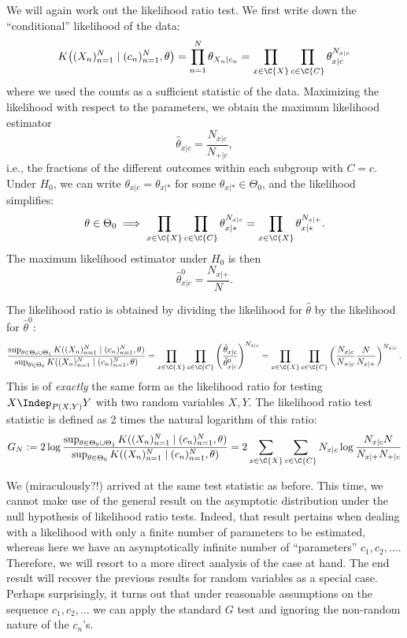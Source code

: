 We will again work out the likelihood ratio test.
We first write down the ``conditional'' likelihood of the data:
$$K\big((X_n)_{n=1}^N \mid (c_n)_{n=1}^N, \theta\big)
= \prod_{n=1}^N \theta_{X_n|c_n} 
= \prod_{x\in\C{X}} \prod_{c\in\C{C}} \theta_{x|c}^{N_{x|c}}$$
where we used the counts as a sufficient statistic of the data.
Maximizing the likelihood with respect to the parameters, we obtain the maximum likelihood estimator
$$\hat \theta_{x|c} = \frac{N_{x|c}}{N_{+|c}},$$
i.e., the fractions of the different outcomes within each subgroup with $C = c$.
Under $H_0$, we can write $\theta_{x|c} = \theta_{x|\ast}$ for some $\theta_{x|\ast} \in \Theta_0$, 
and the likelihood simplifies:
$$\theta \in \Theta_0 \implies \prod_{x\in\C{X}} \prod_{c\in\C{C}} \theta_{x|\ast}^{N_{x|c}} = 
\prod_{x\in\C{X}} \theta_{x|\ast}^{N_{x|+}}.$$
The maximum likelihood estimator under $H_0$ is then
$$\hat \theta^0_{x|c} = \frac{N_{x|+}}{N}.$$

The likelihood ratio is obtained by dividing the likelihood for $\hat \theta$ by the likelihood for $\hat \theta^0$:
\begin{equation}\label{eq:ext_G_test_statistic}
  \frac{\sup_{\theta\in\Theta_0 \cup \Theta_1} K((X_n)_{n=1}^N \mid (c_n)_{n=1}^N, \theta)}{\sup_{\theta\in\Theta_0} K((X_n)_{n=1}^N \mid (c_n)_{n=1}^N, \theta)}
= \prod_{x\in\C{X}} \prod_{c\in\C{C}} \left(\frac{\hat \theta_{x|c}}{\hat \theta^0_{x|c}}\right)^{N_{x|c}} 
= \prod_{x\in\C{X}} \prod_{c\in\C{C}} \left(\frac{N_{x|c}}{N_{+|c}} \frac{N}{N_{x|+}}\right)^{N_{x|c}}.
\end{equation}
This is of \emph{exactly} the same form as the likelihood ratio  for testing
$X \Indep_{P(X,Y)} Y$ with two random variables $X,Y$.
The likelihood ratio test statistic is defined as 2 times the natural logarithm of this ratio:
$$G_N := 2 \log \frac{\sup_{\theta\in\Theta_0 \cup \Theta_1} K((X_n)_{n=1}^N \mid (c_n)_{n=1}^N, \theta)}{\sup_{\theta\in\Theta_0} K((X_n)_{n=1}^N \mid (c_n)_{n=1}^N, \theta)} = 2 \sum_{x\in\C{X}} \sum_{c\in\C{C}} N_{x|c} \log \frac{N_{x|c} N}{N_{x|+} N_{+|c}}$$

We (miraculously?!) arrived at the same test statistic as before.
This time, we cannot make use of the general result on the asymptotic distribution under the null hypothesis of 
likelihood ratio tests. Indeed, that result pertains when dealing
with a likelihood with only a finite number of parameters to be estimated, whereas here we have an asymptotically infinite number
of ``parameters'' $c_1,c_2,\dots$. Therefore, we will resort to a more direct analysis of the case at hand. The end result will
recover the previous results for random variables as a special case. Perhaps surprisingly, it turns out that under reasonable 
assumptions on the sequence $c_1,c_2,\dots$ we can apply the standard $G$ test and ignoring the non-random nature of the $c_n$'s.

